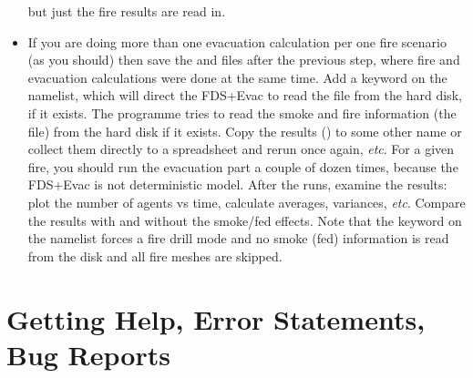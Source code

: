 \documentclass[12pt,a4paper,final,twoside]{stylevk}
\begin{document}
\begin{itemize}
  but just the fire results are read in.
%
\item If you are doing more than one evacuation calculation per one
  fire scenario (as you should) then save the 
  and  files after the previous step, where fire
  and evacuation calculations were done at the same time.  Add a
  keyword  on the 
  namelist, which will direct the FDS+Evac to read the
   file from the hard disk, if it exists.  The
  programme tries to read the smoke and fire information (the
   file) from the hard disk if it exists.  Copy
  the results () to some other name or collect
  them directly to a spreadsheet and rerun once again, \emph{etc}.
  For a given fire, you should run the evacuation part a couple of
  dozen times, because the FDS+Evac is not deterministic model.  After
  the runs, examine the results: plot the number of agents vs time,
  calculate averages, variances, \emph{etc}.  Compare the results with
  and without the smoke/fed effects.  Note that the keyword
   on the  namelist forces a fire
  drill mode and no smoke (fed) information is read from the disk and
  all fire meshes are skipped.
%
\end{itemize}


\section{Getting Help, Error Statements, Bug
  Reports}\label{Sec_ErrorsBugs} 
\end{document}
